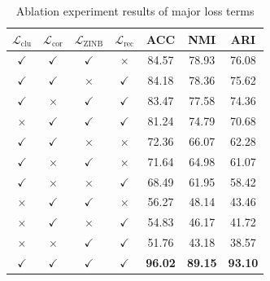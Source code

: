 \begin{table}[t]
\centering
\small
\begin{tabular}{cccc|ccc}
\toprule
\boldmath$\mathcal{L}_{\text{clu}}$ & \boldmath$\mathcal{L}_{\text{cor}}$ & \boldmath$\mathcal{L}_{\text{ZINB}}$ & \boldmath$\mathcal{L}_{\text{rec}}$ & \textbf{ACC} & \textbf{NMI} & \textbf{ARI} \\
\midrule
$\checkmark$ & $\checkmark$ & $\checkmark$ & $\times$      & 84.57 & 78.93 & 76.08 \\
$\checkmark$ & $\checkmark$ & $\times$      & $\checkmark$ & 84.18 & 78.36 & 75.62 \\
$\checkmark$ & $\times$      & $\checkmark$ & $\checkmark$ & 83.47 & 77.58 & 74.36 \\
$\times$      & $\checkmark$ & $\checkmark$ & $\checkmark$ & 81.24 & 74.79 & 70.68 \\
\midrule
$\checkmark$ & $\checkmark$ & $\times$      & $\times$      & 72.36 & 66.07 & 62.28 \\
$\checkmark$ & $\times$      & $\checkmark$ & $\times$      & 71.64 & 64.98 & 61.07 \\ 
$\checkmark$ & $\times$      & $\times$      & $\checkmark$ & 68.49 & 61.95 & 58.42 \\
$\times$      & $\checkmark$ & $\checkmark$ & $\times$      & 56.27 & 48.14 & 43.46 \\ 
$\times$      & $\checkmark$ & $\times$      & $\checkmark$ & 54.83 & 46.17 & 41.72 \\ 
$\times$      & $\times$      & $\checkmark$ & $\checkmark$ & 51.76 & 43.18 & 38.57 \\ 
\midrule
$\checkmark$ & $\checkmark$ & $\checkmark$ & $\checkmark$ & \textbf{96.02} & \textbf{89.15} & \textbf{93.10} \\
\bottomrule
\end{tabular}
\caption{Ablation experiment results of major loss terms}
\label{tab:main_ablation_more}
\end{table}
